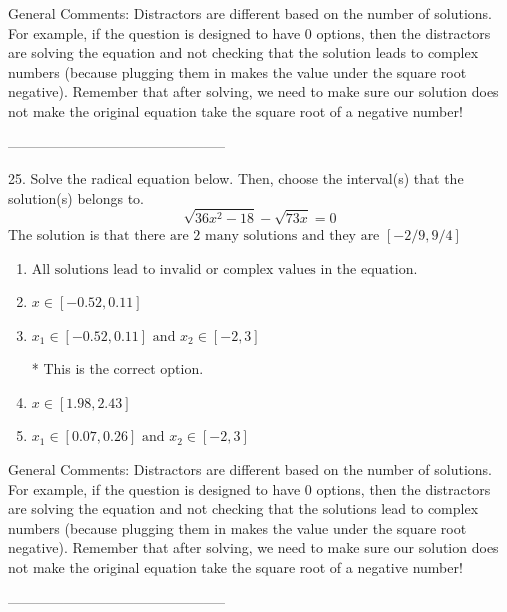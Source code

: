 \documentclass{article}[10pt]
\begin{document}
General Comments: Distractors are different based on the number of solutions. For example, if the question is designed to have 0 options, then the distractors are solving the equation and not checking that the solution leads to complex numbers (because plugging them in makes the value under the square root negative). Remember that after solving, we need to make sure our solution does not make the original equation take the square root of a negative number!

-----------------------------------------------

25. Solve the radical equation below. Then, choose the interval(s) that the solution(s) belongs to.
$$ \sqrt{36 x^2 - 18} - \sqrt{73 x} = 0 $$ 
The solution is $ \text{that there are } 2 \text{ many solutions and they are } [-2/9, 9/4] $ 

\begin{enumerate}[label=\Alph*.] 
\item $ \text{All solutions lead to invalid or complex values in the equation.} $ 

  
\item $ x \in [-0.52,0.11] $ 

  
\item $ x_1 \in [-0.52, 0.11] \text{ and } x_2 \in [-2,3] $ 

 * This is the correct option. 
\item $ x \in [1.98,2.43] $ 

  
\item $ x_1 \in [0.07, 0.26] \text{ and } x_2 \in [-2,3] $ 

  
\end{enumerate} 
 
General Comments: Distractors are different based on the number of solutions. For example, if the question is designed to have 0 options, then the distractors are solving the equation and not checking that the solutions lead to complex numbers (because plugging them in makes the value under the square root negative). Remember that after solving, we need to make sure our solution does not make the original equation take the square root of a negative number!

-----------------------------------------------
\end{document}
